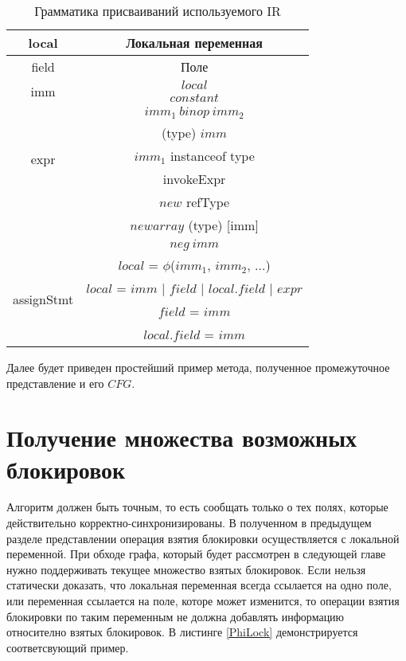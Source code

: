 \begin{table}[H]
\label{tabular:timesandtenses}
\begin{center}
\begin{tabular}{|c|c|}
\hline
local & Локальная переменная \\
\hline
field & Поле \\
\hline
\multirow{2}{*}{imm}  & $local$ \\
		      & $constant$ \\
\hline
\multirow{5}{*}{expr} & $imm_1\ binop\ imm_2$ \\
		      & (type) $imm$ \\
		      & $imm_1$ instanceof type \\
      		      & invokeExpr \\
      		      & $new$ refType \\
      		      & $newarray$ (type) [imm] \\
		      & $neg\ imm$ \\
\hline
\multirow{4}{*}{assignStmt} & $local$ = $\phi$($imm_1$, $imm_2$, ...) \\ 
			    & $local$ = $imm$ | $field$ | $local.field$ | $expr$  \\ 
		            & $field$ = $imm$ \\
			    & $local.field$ = $imm$ \\
\hline
\end{tabular}
\caption{Грамматика присваиваний используемого IR}
\end{center}

\end{table}


Далее будет приведен простейший пример метода, полученное промежуточное представление и его $CFG$.

\renewcommand{\lstlistingname}{}

\renewcommand{\lstlistingname}{Листинг}




\FloatBarrier
\section{Получение множества возможных блокировок}
Алгоритм должен быть точным, то есть сообщать только о тех полях, которые действительно корректно-синхронизированы.
В полученном в предыдущем разделе представлении операция взятия блокировки осуществляется с локальной переменной. 
При обходе графа, который будет рассмотрен в следующей главе нужно поддерживать текущее множество взятых блокировок.
Если нельзя статически доказать, что локальная переменная всегда ссылается на одно поле, или переменная ссылается на поле, которе может изменится, то операции взятия блокировки по таким переменным не должна добавлять информацию относително взятых блокировок.
В листинге \ref{PhiLock} демонстрируется соответсвующий пример.

